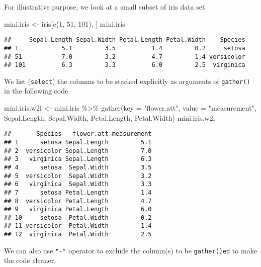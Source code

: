 \documentclass[
]{article}
\newenvironment{Shaded}{\begin{snugshade}}{\end{snugshade}}
\newcommand{\AttributeTok}[1]{\textcolor[rgb]{0.77,0.63,0.00}{#1}}
\newcommand{\DecValTok}[1]{\textcolor[rgb]{0.00,0.00,0.81}{#1}}
\newcommand{\FunctionTok}[1]{\textcolor[rgb]{0.00,0.00,0.00}{#1}}
\newcommand{\NormalTok}[1]{#1}
\newcommand{\OtherTok}[1]{\textcolor[rgb]{0.56,0.35,0.01}{#1}}
\newcommand{\SpecialCharTok}[1]{\textcolor[rgb]{0.00,0.00,0.00}{#1}}
\newcommand{\StringTok}[1]{\textcolor[rgb]{0.31,0.60,0.02}{#1}}
\begin{document}
For illustrative purpose, we look at a small subset of iris data set.

\begin{Shaded}
\begin{Highlighting}[]
\NormalTok{ mini.iris }\OtherTok{\textless{}{-}}\NormalTok{ iris[}\FunctionTok{c}\NormalTok{(}\DecValTok{1}\NormalTok{, }\DecValTok{51}\NormalTok{, }\DecValTok{101}\NormalTok{), ]}
\NormalTok{ mini.iris}
\end{Highlighting}
\end{Shaded}

\begin{verbatim}
##     Sepal.Length Sepal.Width Petal.Length Petal.Width    Species
## 1            5.1         3.5          1.4         0.2     setosa
## 51           7.0         3.2          4.7         1.4 versicolor
## 101          6.3         3.3          6.0         2.5  virginica
\end{verbatim}

We list (\texttt{select}) the columns to be stacked explicitly as
arguments of \texttt{gather()} in the following code.

\begin{Shaded}
\begin{Highlighting}[]
\NormalTok{mini.iris.w2l }\OtherTok{\textless{}{-}}\NormalTok{ mini.iris }\SpecialCharTok{\%\textgreater{}\%}
          \FunctionTok{gather}\NormalTok{(}\AttributeTok{key =} \StringTok{"flower.att"}\NormalTok{, }\AttributeTok{value =} \StringTok{"measurement"}\NormalTok{,}
\NormalTok{           Sepal.Length, Sepal.Width, Petal.Length, Petal.Width)}
\NormalTok{mini.iris.w2l}
\end{Highlighting}
\end{Shaded}

\begin{verbatim}
##       Species   flower.att measurement
## 1      setosa Sepal.Length         5.1
## 2  versicolor Sepal.Length         7.0
## 3   virginica Sepal.Length         6.3
## 4      setosa  Sepal.Width         3.5
## 5  versicolor  Sepal.Width         3.2
## 6   virginica  Sepal.Width         3.3
## 7      setosa Petal.Length         1.4
## 8  versicolor Petal.Length         4.7
## 9   virginica Petal.Length         6.0
## 10     setosa  Petal.Width         0.2
## 11 versicolor  Petal.Width         1.4
## 12  virginica  Petal.Width         2.5
\end{verbatim}

We can also use \texttt{"-"} operator to exclude the column(s) to be
\texttt{gather()ed} to make the code cleaner.
\end{document}
